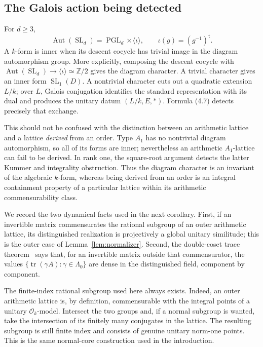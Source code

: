 \documentclass[11pt,reqno]{amsart}
\theoremstyle{definition}
\theoremstyle{remark}
\newcommand{\Z}{\mathbb Z}
\newcommand{\cO}{\mathcal O}
\newcommand{\Tr}{\operatorname{tr}}
\newcommand{\SL}{\operatorname{SL}}
\newcommand{\PGL}{\operatorname{PGL}}
\begin{document}
\subsection{The Galois action being detected}

For \(d\ge3\),
\[
 \operatorname{Aut}(\SL_d)=\PGL_d\rtimes\langle\iota\rangle,
 \qquad \iota(g)=(g^{-1})^{\mathsf t}.
\]
A \(k\)-form is inner when its descent cocycle has trivial image in the
diagram automorphism group.  More explicitly, composing the descent cocycle
with
\(\operatorname{Aut}(\SL_d)\to\langle\iota\rangle\simeq\Z/2\)
gives the diagram character.  A trivial character gives an inner form
\(\SL_1(D)\).  A nontrivial character cuts out a quadratic extension \(L/k\);
over \(L\), Galois conjugation identifies the standard representation with
its dual and produces the unitary datum \((L/k,E,*)\).  Formula (4.7)
detects precisely that exchange.

This should not be confused with the distinction between an arithmetic
lattice and a lattice \emph{derived} from an order.  Type \(A_1\) has no
nontrivial diagram automorphism, so all of its forms are inner; nevertheless
an arithmetic \(A_1\)-lattice can fail to be derived.  In rank one, the
square-root argument detects the latter Kummer and integrality obstruction.  Thus the
diagram character is an invariant of the algebraic \(k\)-form, whereas
being derived from an order is an integral containment property of a
particular lattice within its arithmetic commensurability class.

We record the two dynamical facts used in the next corollary.  First, if an
invertible matrix commensurates the rational subgroup of an outer arithmetic
lattice, its distinguished realization is projectively a global unitary
similitude; this is the outer case of Lemma~\ref{lem:normalizer}.  Second, the
double-coset trace theorem~\cite{Bogachev} says that, for an invertible
matrix outside that commensurator, the values
\(\{\Tr(\gamma A):\gamma\in\Lambda_0\}\) are dense in the distinguished
field, component by component.

The finite-index rational subgroup used here always exists.  Indeed, an
outer arithmetic lattice is, by definition, commensurable with the integral
points of a unitary \(\cO_k\)-model.  Intersect the two groups and, if a
normal subgroup is wanted, take the intersection of its finitely many
conjugates in the lattice.  The resulting subgroup is still finite index and
consists of genuine unitary norm-one points.  This is the same normal-core
construction used in the introduction.
\end{document}
